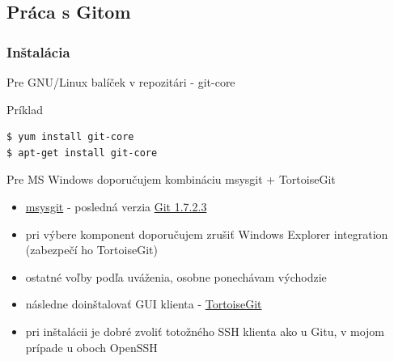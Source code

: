 \documentclass[red]{beamer}
\begin{document}
\subsection{Práca s Gitom}

\begin{frame}[fragile]
\frametitle{Inštalácia}   

Pre GNU/Linux  balíček v repozitári - git-core
\begin{block}{Príklad}
\begin{verbatim}
$ yum install git-core		
$ apt-get install git-core		
\end{verbatim}
\end{block}
Pre MS Windows doporučujem kombináciu msysgit + TortoiseGit
\begin{itemize}
\item \href{http://code.google.com/p/msysgit/}{msysgit} - posledná verzia \href{ http://code.google.com/p/msysgit/downloads/detail?name=Git-1.7.2.3-preview20100911.exe}{Git 1.7.2.3}
\item pri výbere komponent doporučujem zrušiť Windows Explorer integration (zabezpečí ho TortoiseGit)
\item ostatné voľby podľa uváženia, osobne ponechávam východzie
\item následne doinštalovať GUI klienta - \href{ http://code.google.com/p/tortoisegit/}{TortoiseGit}
\item pri inštalácii je dobré zvoliť totožného SSH klienta ako u Gitu, v mojom prípade u oboch OpenSSH
 \end{itemize}
\end{frame}
\end{document}
